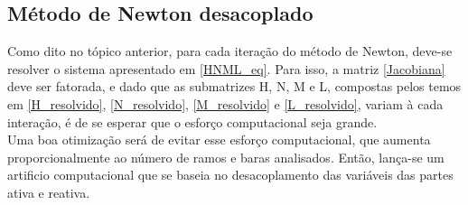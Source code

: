 \subsection{Método de Newton desacoplado}
\label{SubsectionMetodoDeNewtonDesacoplado}
Como dito no tópico anterior, para cada iteração do método de Newton, deve-se resolver o sistema apresentado em \ref{HNML_eq}. Para isso, a matriz \ref{Jacobiana} deve ser fatorada, e dado que as submatrizes H, N, M e L, compostas pelos temos em \ref{H_resolvido}, \ref{N_resolvido}, \ref{M_resolvido} e \ref{L_resolvido}, variam à cada interação, é de se esperar que o esforço computacional seja grande.\\
Uma boa otimização será de evitar esse esforço computacional, que aumenta proporcionalmente ao número de ramos e baras analisados. Então, lança-se um artificio computacional que se baseia no desacoplamento das variáveis das partes ativa e reativa.

